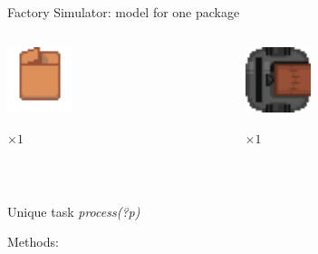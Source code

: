 \begin{frame}[fragile]{Factory Simulator: model for one package}
    \centering
    \begin{columns}
        \begin{column}{0.5\textwidth}
            \centering
            \includegraphics[width = 0.3\textwidth]{images/godot/package.png}
            
            \LARGE \emph{$\times 1$}
        \end{column}
        \begin{column}{0.5\textwidth}
            \centering
            \includegraphics[width = 0.3\textwidth]{images/godot/robot_texture.png}
            
            \LARGE \emph{$\times 1$}
        \end{column}
    \end{columns}
    \pause
    \centering

    ~~

    Unique task \textit{process(?p)}

    Methods:
    

\end{frame}
